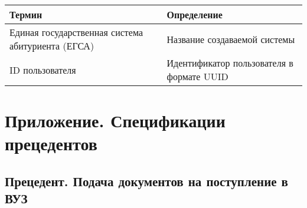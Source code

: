 \documentclass[a4paper, 14pt]{extarticle}
\begin{document}
\begin{longtable}{|L{0.26\textwidth}|L{0.69\textwidth}|}
  \hline
  \textbf{Термин}                                   &
  \textbf{Определение}                                \\
  \hline
  Единая государственная система абитуриента (ЕГСА) &
  Название создаваемой системы                        \\
  \hline
  ID пользователя                                   &
  Идентификатор пользователя в формате UUID           \\
  \hline
\end{longtable}

\newpage

\section*{Приложение. Спецификации прецедентов}

\subsection*{Прецедент. Подача документов на поступление в ВУЗ}
\end{document}
